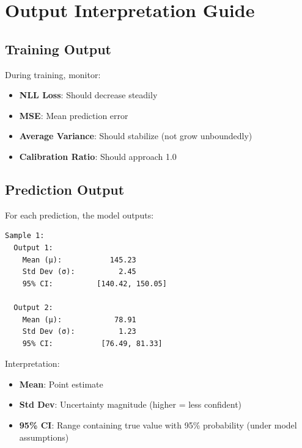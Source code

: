 \documentclass[11pt,a4paper]{article}
\begin{document}
\section{Output Interpretation Guide}

\subsection{Training Output}

During training, monitor:
\begin{itemize}
    \item \textbf{NLL Loss}: Should decrease steadily
    \item \textbf{MSE}: Mean prediction error
    \item \textbf{Average Variance}: Should stabilize (not grow unboundedly)
    \item \textbf{Calibration Ratio}: Should approach 1.0
\end{itemize}

\subsection{Prediction Output}

For each prediction, the model outputs:
\begin{verbatim}
Sample 1:
  Output 1:
    Mean (μ):           145.23
    Std Dev (σ):          2.45
    95% CI:          [140.42, 150.05]

  Output 2:
    Mean (μ):            78.91
    Std Dev (σ):          1.23
    95% CI:           [76.49, 81.33]
\end{verbatim}

Interpretation:
\begin{itemize}
    \item \textbf{Mean}: Point estimate
    \item \textbf{Std Dev}: Uncertainty magnitude (higher = less confident)
    \item \textbf{95\% CI}: Range containing true value with 95\% probability (under model assumptions)
\end{itemize}
\end{document}
